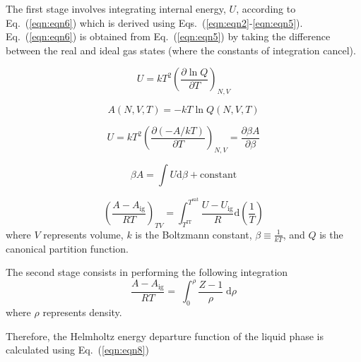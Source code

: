 \documentclass[5p,times]{elsarticle}
\begin{document}
The first stage involves integrating internal energy, $U$, according to Eq.~(\ref{eqn:eqn6}) which is derived using Eqs.~(\ref{eqn:eqn2}-\ref{eqn:eqn5}). Eq.~(\ref{eqn:eqn6}) is obtained from Eq.~(\ref{eqn:eqn5}) by taking the difference between the real and ideal gas states (where the constants of integration cancel). 

\begin{equation}
U=kT^{2} \left( \frac{\partial \ln Q}{\partial T}\right) _{N,V}  \label{eqn:eqn2}
\end{equation}

\begin{equation}
A \left( N,V,T \right)=-kT \ln Q\left(N,V,T\right)
\label{eqn:eqn3}
\end{equation}

\begin{equation}
U=kT^{2} \left( \frac{\partial (-A/kT)}{\partial T} \right)_{N,V} =\frac{\partial \beta A}{\partial \beta }  \label{eqn:eqn4}
\end{equation}

\begin{equation}
\beta A=\int U\mathrm{d} \beta + \mathrm{constant}  \label{eqn:eqn5}
\end{equation}

\begin{equation}
 \left(\frac{ A-A_\mathrm{ig} }{RT}\right)_{TV} =\int _{T^{\mathrm{IT}}}^{T^{\mathrm{\mathrm{sat}}}} \frac{U-U_\mathrm{ig}}{R} \mathrm{d}\left( \frac{1}{T} \right) \label{eqn:eqn6}
\end{equation}
where $V$ represents volume,  $k$ is the Boltzmann constant, $\beta \equiv \frac{1}{kT}$, and $Q$ is the canonical partition function.


The second stage consists in performing the following integration
\begin{equation}
\frac{A-A_\mathrm{ig}}{RT} =\; \int _{0}^{\rho }\frac{Z-1}{\rho } \; \mathrm{d}\rho \label{eqn:eqn7}
\end{equation}
where $\rho$ represents density.

Therefore, the Helmholtz energy departure function of the liquid phase is calculated using Eq.~(\ref{eqn:eqn8})
\end{document}
